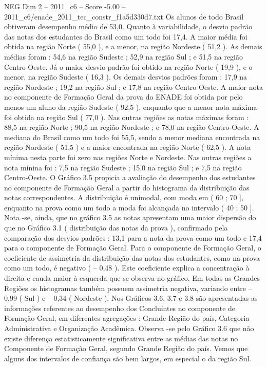 \begin{textsample}{NEG Dim 2 – 2011\_c6 – Score -5.00 – 2011\_c6/enade\_2011\_tec\_constr\_f1a5d330d7.txt}
Os alunos de todo Brasil obtiveram desempenho médio de 53,0.
Quanto à variabilidade, o desvio padrão das notas dos estudantes do Brasil como um todo foi 17,4.
A maior média foi obtida na região Norte ( 55,0 ), e a menor, na região Nordeste ( 51,2 ).
As demais médias foram : 54,6 na região Sudeste ; 52,9 na região Sul ; e 51,5 na região Centro-Oeste.
Já o maior desvio padrão foi obtido na região Norte ( 19,9 ), e o menor, na região Sudeste ( 16,3 ).
Os demais desvios padrões foram : 17,9 na região Nordeste ; 19,2 na região Sul ; e 17,8 na região Centro-Oeste.
A maior nota no componente de Formação Geral da prova do ENADE foi obtida por pelo menos um aluno da região Sudeste ( 92,5 ), enquanto que a menor nota máxima foi obtida na região Sul ( 77,0 ).
Nas outras regiões as notas máximas foram : 88,5 na região Norte ; 90,5 na região Nordeste ; e 78,0 na região Centro-Oeste.
A mediana do Brasil como um todo foi 55,5, sendo a menor mediana encontrada na região Nordeste ( 51,5 ) e a maior encontrada na região Norte ( 62,5 ).
A nota mínima nesta parte foi zero nas regiões Norte e Nordeste.
Nas outras regiões a nota mínina foi : 7,5 na região Sudeste ; 15,0 na região Sul ; e 7,5 na região Centro-Oeste.
O Gráfico 3.5 propicia a avaliação do desempenho dos estudantes no componente de Formação Geral a partir do histograma da distribuição das notas correspondentes.
A distribuição é unimodal, com moda em ( 60 ; 70 ], enquanto na prova como um todo a moda foi alcançada no intervalo ( 40 ; 50 ].
Nota -se, ainda, que no gráfico 3.5 as notas apresentam uma maior dispersão do que no Gráfico 3.1 ( distribuição das notas da prova ), confirmado pela comparação dos desvios padrões : 13,1 para a nota da prova como um todo e 17,4 para o componente de Formação Geral.
Para o componente de Formação Geral, o coeficiente de assimetria da distribuição das notas dos estudantes, como na prova como um todo, é negativo ( – 0,48 ).
Este coeficiente explica a concentração à direita e cauda maior à esquerda que se observa no gráfico.
Em todas as Grandes Regiões os histogramas também possuem assimetria negativa, variando entre – 0,99 ( Sul ) e – 0,34 ( Nordeste ).
Nos Gráficos 3.6, 3.7 e 3.8 são apresentadas as informações referentes ao desempenho dos Concluintes no componente de Formação Geral, em diferentes agregações : Grande Região do país, Categoria Administrativa e Organização Acadêmica.
Observa -se pelo Gráfico 3.6 que não existe diferença estatisticamente significativa entre as médias das notas no Componente de Formação Geral, segundo Grande Região do país.
Vemos que alguns dos intervalos de confiança são bem largos, em especial o da região Sul.

\end{textsample}
